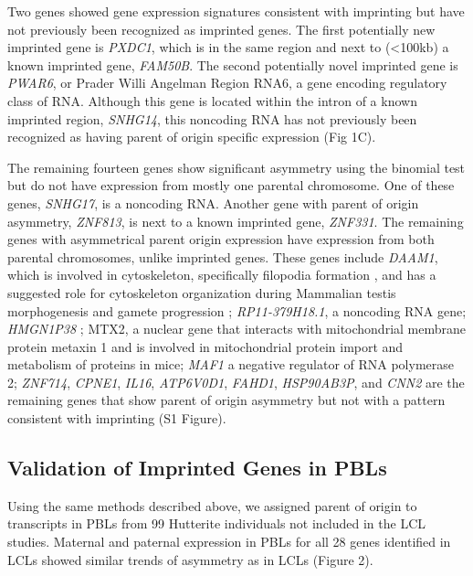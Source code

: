 Two genes showed gene expression signatures consistent with imprinting but have not previously been recognized as imprinted genes. The first potentially new imprinted gene is \emph{PXDC1}, which is in the same region and next to (\textless100kb) a known imprinted gene, \emph{FAM50B}. The second potentially novel imprinted gene is \emph{PWAR6}, or Prader Willi Angelman Region RNA6, a gene encoding regulatory class of RNA. Although this gene is located within the intron of a known imprinted region, \emph{SNHG14}, this noncoding RNA has not previously been recognized as having parent of origin specific expression (Fig 1C).

The remaining fourteen genes show significant asymmetry using the binomial test but do not have expression from mostly one parental chromosome. One of these genes, \emph{SNHG17}, is a noncoding RNA. Another gene with parent of origin asymmetry,  \emph{ZNF813}, is next to a known imprinted gene, \emph{ZNF331}. The remaining genes with asymmetrical parent origin expression have expression from both parental chromosomes, unlike imprinted genes. These genes include  \emph{DAAM1},  which is involved in cytoskeleton, specifically filopodia formation \citep{Hoffmann:2014ki, Luo:2016db}, and has a suggested role for cytoskeleton organization during Mammalian testis morphogenesis and gamete progression \citep{Pariante:2016kn};  \emph{RP11-379H18.1}, a noncoding RNA gene;  \emph{HMGN1P38} \citep{StrichmanAlmashanu:2003cw}; MTX2, a nuclear gene that interacts with mitochondrial membrane protein metaxin 1 and is involved in mitochondrial protein import and metabolism of proteins in mice;   \emph{MAF1} a negative regulator of RNA polymerase 2;  \emph{ZNF714},  \emph{CPNE1},  \emph{IL16},  \emph{ATP6V0D1},  \emph{FAHD1},  \emph{HSP90AB3P}, and  \emph{CNN2} are the remaining genes that show parent of origin asymmetry but not with a pattern consistent with imprinting (S1 Figure).

\subsection{Validation of Imprinted Genes in PBLs}\label{Validation of Imprinted Genes in PBLs}
Using the same methods described above, we assigned parent of origin to transcripts in PBLs from 99 Hutterite individuals not included in the LCL studies. Maternal and paternal expression in PBLs for all 28 genes identified in LCLs showed similar trends of asymmetry as in LCLs (Figure 2). 


